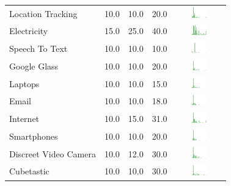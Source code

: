 \begin{table}[H!]
\begin{center}
\begin{tabular}{| p{2cm} | p{1cm} | p{1cm} | p{1cm} | c |}
Location Tracking  & 10.0 & 10.0 & 20.0 & \includegraphics[width = 2cm, height = 0.5cm]{tables/locationtrackingrisk} \\ 
Electricity & 15.0 & 25.0 & 40.0 & \includegraphics[width = 2cm, height = 0.5cm]{tables/ElectricityRisk} \\ 
Speech To Text  & 10.0 & 10.0 & 10.0 & \includegraphics[width = 2cm, height = 0.5cm]{tables/speechtotextrisk} \\ 
Google Glass  & 10.0 & 10.0 & 20.0 & \includegraphics[width = 2cm, height = 0.5cm]{tables/googleglassrisk} \\ 
Laptops  & 10.0 & 10.0 & 15.0 & \includegraphics[width = 2cm, height = 0.5cm]{tables/laptopsrisk} \\ 
Email  & 10.0 & 10.0 & 18.0 & \includegraphics[width = 2cm, height = 0.5cm]{tables/emailrisk} \\ 
Internet  & 10.0 & 15.0 & 31.0 & \includegraphics[width = 2cm, height = 0.5cm]{tables/internetrisk} \\ 
Smartphones  & 10.0 & 10.0 & 20.0 & \includegraphics[width = 2cm, height = 0.5cm]{tables/smartphonesrisk} \\ 
Discreet Video Camera  & 10.0 & 12.0 & 30.0 & \includegraphics[width = 2cm, height = 0.5cm]{tables/discreetvideocamerarisk} \\ 
Cubetastic  & 10.0 & 10.0 & 30.0 & \includegraphics[width = 2cm, height = 0.5cm]{tables/cubetasticrisk} \\ 

\end{tabular}
\end{center}
\end{table}

